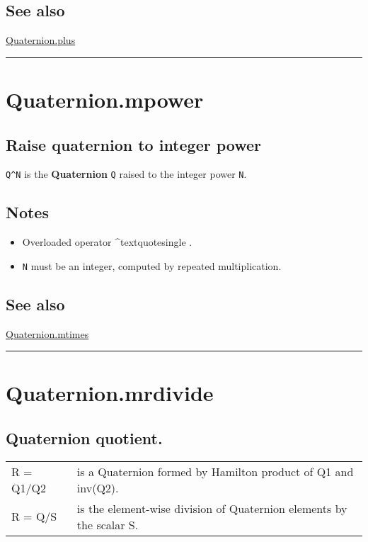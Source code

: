 \subsection*{See also}


\hyperlink{Quaternion.plus}{\color{blue} Quaternion.plus}

\vspace{1.5ex}\hrule

\hypertarget{Quaternion.mpower}{\section*{Quaternion.mpower}}
\subsection*{Raise quaternion to integer power}


\texttt{Q\textasciicircum N} is the \textbf{\color{red} Quaternion} \texttt{Q} raised to the integer power \texttt{N}.


\subsection*{Notes}
\begin{itemize}
  \item Overloaded operator \textquotesingle\textasciicircum textquotesingle .
  \item \texttt{N} must be an integer, computed by repeated multiplication.
\end{itemize}

\subsection*{See also}


\hyperlink{Quaternion.mtimes}{\color{blue} Quaternion.mtimes}

\vspace{1.5ex}\hrule

\hypertarget{Quaternion.mrdivide}{\section*{Quaternion.mrdivide}}
\subsection*{Quaternion quotient.}
\begin{longtable}{lp{120mm}}
R = Q1/Q2 & is a Quaternion formed by Hamilton product of Q1 and inv(Q2).\\ 
R = Q/S & is the element-wise division of Quaternion elements by the scalar S.\\ 
\end{longtable}\vspace{1ex}

